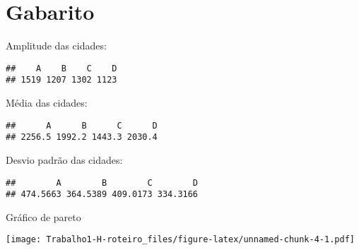 \documentclass[]{article}
\begin{document}
\section{Gabarito}\label{gabarito}

Amplitude das cidades:

\begin{verbatim}
##    A    B    C    D 
## 1519 1207 1302 1123
\end{verbatim}

Média das cidades:

\begin{verbatim}
##      A      B      C      D 
## 2256.5 1992.2 1443.3 2030.4
\end{verbatim}

Desvio padrão das cidades:

\begin{verbatim}
##        A        B        C        D 
## 474.5663 364.5389 409.0173 334.3166
\end{verbatim}

Gráfico de pareto

\texttt{[image: Trabalho1-H-roteiro\_files/figure-latex/unnamed-chunk-4-1.pdf]}\\
\end{document}
